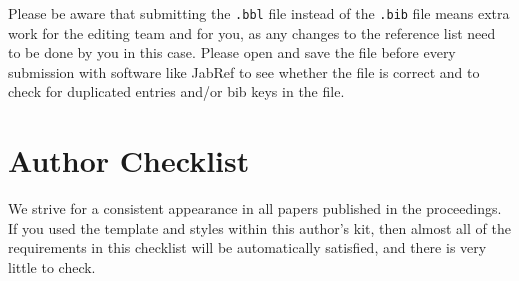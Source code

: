 \documentclass{scspaperproc}
\theoremstyle{scsthe}
\begin{document}
    Please be aware that submitting the \texttt{.bbl} file instead of the \texttt{.bib} file means extra work for the editing team and for you, as any changes to the reference list need to be done by you in this case.
    Please open and save the file before every submission with software like JabRef to see whether the file is correct and to check for duplicated entries and/or bib keys in the file.


    \section{Author Checklist}
    We strive for a consistent appearance in all papers published in the proceedings. If you used the template and styles within this author’s kit, then almost all of the requirements in this checklist will be automatically satisfied, and there is very little to check.
\end{document}
